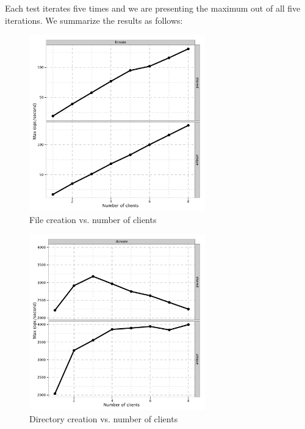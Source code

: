 Each test iterates five times and we are presenting the maximum out of all five iterations. 
We summarize the results as follows:

\begin{figure}[htb]
\centering
\includegraphics[width=3in]{data/mdtest-fcreate}
\caption{File creation vs.  number of clients}
\label{fig:mdtest-fcreate}
\end{figure}

\begin{figure}[htb]
\centering
\includegraphics[width=3in]{data/mdtest-dcreate}
\caption{Directory creation vs. number of clients}
\label{fig:mdtest-dcreate}
\end{figure}



